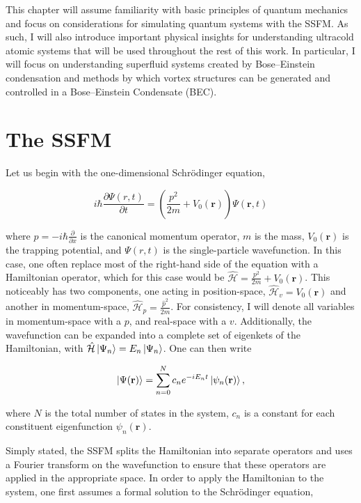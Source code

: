 This chapter will assume familiarity with basic principles of quantum mechanics and focus on considerations for simulating quantum systems with the SSFM.
As such, I will also introduce important physical insights for understanding ultracold atomic systems that will be used throughout the rest of this work.
In particular, I will focus on understanding superfluid systems created by Bose--Einstein condensation and methods by which vortex structures can be generated and controlled in a Bose--Einstein Condensate (BEC).


\section{The SSFM}
Let us begin with the one-dimensional Schr\"odinger equation,

\begin{equation}
i\hbar \frac{\partial \Psi(r, t)}{\partial t} = \left(\frac{p^2}{2m} + V_0(\mathbf{r}) \right)\Psi(\mathbf{r},t)
\label{eqn:schrody}
\end{equation}

\noindent where $\hat p = -i\hbar\frac{\partial}{\partial x}$ is the canonical momentum operator, $m$ is the mass, $V_0(\mathbf{r})$ is the trapping potential, and $\Psi(r,t)$ is the single-particle wavefunction.
In this case, one often replace most of the right-hand side of the equation with a Hamiltonian operator, which for this case would be $\mathcal{\hat H} = \frac{p^2}{2m} + V_0(\mathbf{r})$.
This noticeably has two components, one acting in position-space, $\mathcal{\hat H}_v = V_0(\mathbf{r})$ and another in momentum-space, $\mathcal{\hat H}_p = \frac{\hat p^2}{2m}$.
For consistency, I will denote all variables in momentum-space with a $p$, and real-space with a $v$.
Additionally, the wavefunction can be expanded into a complete set of eigenkets of the Hamiltonian, with $\mathcal{\hat H}\ket{\Psi_n} = E_n\ket{\Psi_n}$.
One can then write

\begin{equation}
\ket{\Psi(\mathbf{r})} = \sum_{n=0}^N c_n e^{-iE_nt}\ket{\psi_n(\mathbf{r})},
\end{equation}

\noindent where $N$ is the total number of states in the system, $c_n$ is a constant for each constituent eigenfunction $\psi_n(\mathbf{r})$.

Simply stated, the SSFM splits the Hamiltonian into separate operators and uses a Fourier transform on the wavefunction to ensure that these operators are applied in the appropriate space.
In order to apply the Hamiltonian to the system, one first assumes a formal solution to the Schr\"odinger equation,

